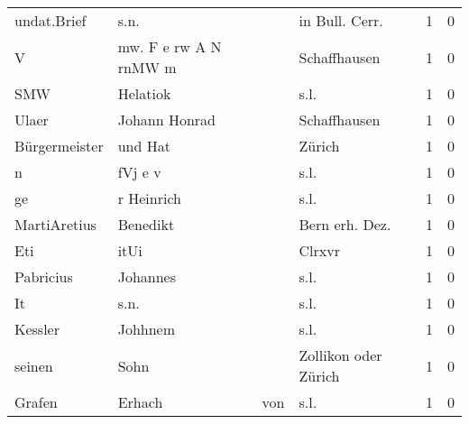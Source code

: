 \begin{center}
\begin{tiny}
\begin{longtabu}{llllrr}
              undat.Brief &                               s.n. &             &                             in Bull. Cerr.  &          1 &         0 \\
                        V &              mw. F e rw A N rnMW m &             &                                Schaffhausen &          1 &         0 \\
                      SMW &                           Helatiok &             &                                        s.l. &          1 &         0 \\
                    Ulaer &                      Johann Honrad &             &                                Schaffhausen &          1 &         0 \\
            Bürgermeister &                            und Hat &             &                                      Zürich &          1 &         0 \\
                        n &                            fVj e v &             &                                        s.l. &          1 &         0 \\
                       ge &                         r Heinrich &             &                                        s.l. &          1 &         0 \\
             MartiAretius &                           Benedikt &             &                             Bern erh. Dez.  &          1 &         0 \\
                      Eti &                               itUi &             &                                      Clrxvr &          1 &         0 \\
                Pabricius &                           Johannes &             &                                        s.l. &          1 &         0 \\
                       It &                               s.n. &             &                                        s.l. &          1 &         0 \\
                  Kessler &                            Johhnem &             &                                        s.l. &          1 &         0 \\
                   seinen &                               Sohn &             &                        Zollikon oder Zürich &          1 &         0 \\
                   Grafen &                             Erhach &         von &                                        s.l. &          1 &         0 \\

\end{longtabu}
\end{tiny}
\end{center}
